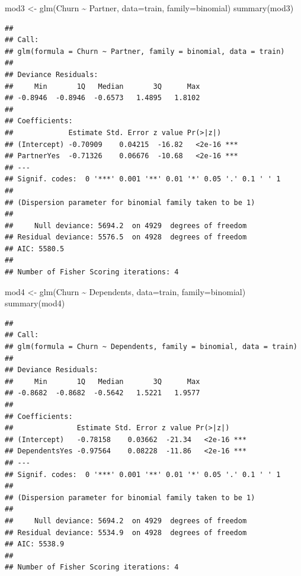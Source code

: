 \documentclass[
  twoside]{article}
\newenvironment{Shaded}{\begin{snugshade}}{\end{snugshade}}
\newcommand{\AttributeTok}[1]{\textcolor[rgb]{0.77,0.63,0.00}{#1}}
\newcommand{\FunctionTok}[1]{\textcolor[rgb]{0.00,0.00,0.00}{#1}}
\newcommand{\NormalTok}[1]{#1}
\newcommand{\OtherTok}[1]{\textcolor[rgb]{0.56,0.35,0.01}{#1}}
\newcommand{\SpecialCharTok}[1]{\textcolor[rgb]{0.00,0.00,0.00}{#1}}
\begin{document}
\begin{Shaded}
\begin{Highlighting}[]
\NormalTok{mod3 }\OtherTok{\textless{}{-}} \FunctionTok{glm}\NormalTok{(Churn }\SpecialCharTok{\textasciitilde{}}\NormalTok{ Partner, }\AttributeTok{data=}\NormalTok{train, }\AttributeTok{family=}\NormalTok{binomial)}
\FunctionTok{summary}\NormalTok{(mod3)}
\end{Highlighting}
\end{Shaded}

\begin{verbatim}
## 
## Call:
## glm(formula = Churn ~ Partner, family = binomial, data = train)
## 
## Deviance Residuals: 
##     Min       1Q   Median       3Q      Max  
## -0.8946  -0.8946  -0.6573   1.4895   1.8102  
## 
## Coefficients:
##             Estimate Std. Error z value Pr(>|z|)    
## (Intercept) -0.70909    0.04215  -16.82   <2e-16 ***
## PartnerYes  -0.71326    0.06676  -10.68   <2e-16 ***
## ---
## Signif. codes:  0 '***' 0.001 '**' 0.01 '*' 0.05 '.' 0.1 ' ' 1
## 
## (Dispersion parameter for binomial family taken to be 1)
## 
##     Null deviance: 5694.2  on 4929  degrees of freedom
## Residual deviance: 5576.5  on 4928  degrees of freedom
## AIC: 5580.5
## 
## Number of Fisher Scoring iterations: 4
\end{verbatim}

\begin{Shaded}
\begin{Highlighting}[]
\NormalTok{mod4 }\OtherTok{\textless{}{-}} \FunctionTok{glm}\NormalTok{(Churn }\SpecialCharTok{\textasciitilde{}}\NormalTok{ Dependents, }\AttributeTok{data=}\NormalTok{train, }\AttributeTok{family=}\NormalTok{binomial)}
\FunctionTok{summary}\NormalTok{(mod4)}
\end{Highlighting}
\end{Shaded}

\begin{verbatim}
## 
## Call:
## glm(formula = Churn ~ Dependents, family = binomial, data = train)
## 
## Deviance Residuals: 
##     Min       1Q   Median       3Q      Max  
## -0.8682  -0.8682  -0.5642   1.5221   1.9577  
## 
## Coefficients:
##               Estimate Std. Error z value Pr(>|z|)    
## (Intercept)   -0.78158    0.03662  -21.34   <2e-16 ***
## DependentsYes -0.97564    0.08228  -11.86   <2e-16 ***
## ---
## Signif. codes:  0 '***' 0.001 '**' 0.01 '*' 0.05 '.' 0.1 ' ' 1
## 
## (Dispersion parameter for binomial family taken to be 1)
## 
##     Null deviance: 5694.2  on 4929  degrees of freedom
## Residual deviance: 5534.9  on 4928  degrees of freedom
## AIC: 5538.9
## 
## Number of Fisher Scoring iterations: 4
\end{verbatim}
\end{document}
